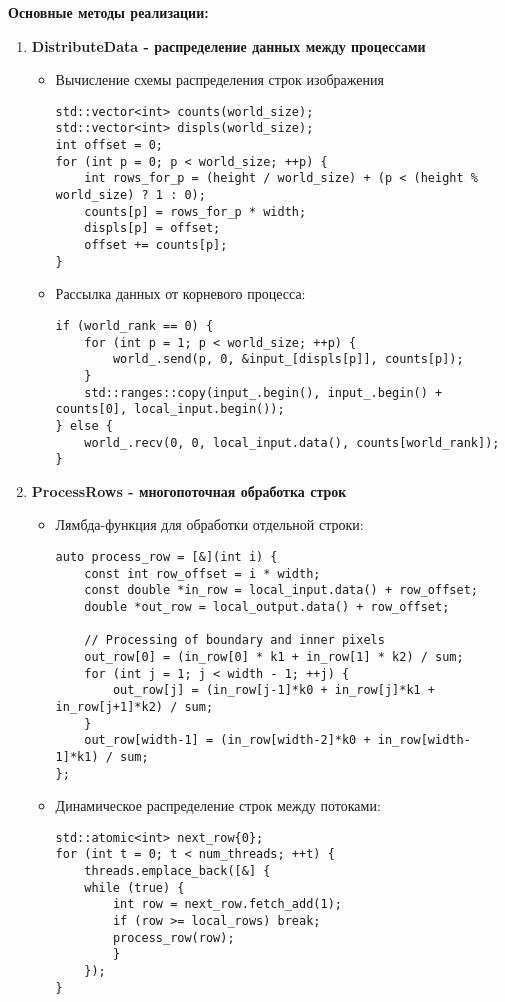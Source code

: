 \documentclass[12pt]{article}
\begin{document}
\textbf{Основные методы реализации:}

\begin{enumerate}
\item \textbf{DistributeData - распределение данных между процессами}
\begin{itemize}
\item Вычисление схемы распределения строк изображения
\begin{lstlisting}
std::vector<int> counts(world_size);
std::vector<int> displs(world_size);
int offset = 0;
for (int p = 0; p < world_size; ++p) {
    int rows_for_p = (height / world_size) + (p < (height % world_size) ? 1 : 0);
    counts[p] = rows_for_p * width;
    displs[p] = offset;
    offset += counts[p];
}
\end{lstlisting}

\item Рассылка данных от корневого процесса:
\begin{lstlisting}
if (world_rank == 0) {
    for (int p = 1; p < world_size; ++p) {
        world_.send(p, 0, &input_[displs[p]], counts[p]);
    }
    std::ranges::copy(input_.begin(), input_.begin() + counts[0], local_input.begin());
} else {
    world_.recv(0, 0, local_input.data(), counts[world_rank]);
}
\end{lstlisting}
\end{itemize}

\item \textbf{ProcessRows - многопоточная обработка строк}
\begin{itemize}
\item Лямбда-функция для обработки отдельной строки:
\begin{lstlisting}
auto process_row = [&](int i) {
    const int row_offset = i * width;
    const double *in_row = local_input.data() + row_offset;
    double *out_row = local_output.data() + row_offset;

    // Processing of boundary and inner pixels
    out_row[0] = (in_row[0] * k1 + in_row[1] * k2) / sum;
    for (int j = 1; j < width - 1; ++j) {
        out_row[j] = (in_row[j-1]*k0 + in_row[j]*k1 + in_row[j+1]*k2) / sum;
    }
    out_row[width-1] = (in_row[width-2]*k0 + in_row[width-1]*k1) / sum;
};
\end{lstlisting}
\item Динамическое распределение строк между потоками:
\begin{lstlisting}
std::atomic<int> next_row{0};
for (int t = 0; t < num_threads; ++t) {
    threads.emplace_back([&] {
    while (true) {
        int row = next_row.fetch_add(1);
        if (row >= local_rows) break;
        process_row(row);
        }
    });
}
\end{lstlisting}
\end{itemize}


\end{enumerate}
\end{document}

